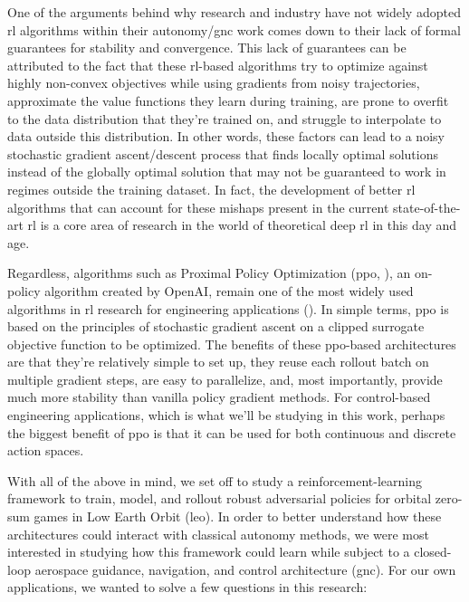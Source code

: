One of the arguments behind why research and industry have not widely adopted \acs{rl} algorithms within their autonomy/\acs{gnc} work comes down to their lack of formal guarantees for stability and convergence. This lack of guarantees can be attributed to the fact that these \acs{rl}-based algorithms try to optimize against highly non-convex objectives while using gradients from noisy trajectories, approximate the value functions they learn during training, are prone to overfit to the data distribution that they're trained on, and struggle to interpolate to data outside this distribution. In other words, these factors can lead to a noisy stochastic gradient ascent/descent process that finds locally optimal solutions instead of the globally optimal solution that may not be guaranteed to work in regimes outside the training dataset. In fact, the development of better \acs{rl} algorithms that can account for these mishaps present in the current state-of-the-art \acs{rl} is a core area of research in the world of theoretical deep \acs{rl} in this day and age. 

Regardless, algorithms such as Proximal Policy Optimization (\acs{ppo}, \cite{schulman2017ppo}), an on-policy algorithm created by OpenAI, remain one of the most widely used algorithms in \acs{rl} research for engineering applications (\cite{francois2018introduction}). In simple terms, \acs{ppo} is based on the principles of stochastic gradient ascent on a clipped surrogate objective function to be optimized. The benefits of these \acs{ppo}-based architectures are that they're relatively simple to set up, they reuse each rollout batch on multiple gradient steps, are easy to parallelize, and, most importantly, provide much more stability than vanilla policy gradient methods. For control-based engineering applications, which is what we'll be studying in this work, perhaps the biggest benefit of \acs{ppo} is that it can be used for both continuous and discrete action spaces.



With all of the above in mind, we set off to study a reinforcement-learning framework to train, model, and rollout robust adversarial policies for orbital zero-sum games in Low Earth Orbit (\acs{leo}). In order to better understand how these architectures could interact with classical autonomy methods, we were most interested in studying how this framework could learn while subject to a closed-loop aerospace guidance, navigation, and control architecture (\acs{gnc}). For our own applications, we wanted to solve a few questions in this research:

